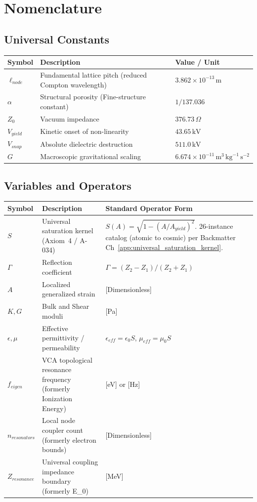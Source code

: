 \chapter*{Nomenclature}

\section*{Universal Constants}
\begin{table}[h]
\centering
\begin{tabularx}{\textwidth}{@{}l l X@{}}
\toprule
\textbf{Symbol} & \textbf{Description} & \textbf{Value / Unit} \\
\midrule
$\ell_{node}$ & Fundamental lattice pitch (reduced Compton wavelength) & $3.862 \times 10^{-13}\,\text{m}$ \\
$\alpha$ & Structural porosity (Fine-structure constant) & $1/137.036$ \\
$Z_0$ & Vacuum impedance & $376.73\,\Omega$ \\
$V_{yield}$ & Kinetic onset of non-linearity & $43.65\,\text{kV}$ \\
$V_{snap}$ & Absolute dielectric destruction & $511.0\,\text{kV}$ \\
$G$ & Macroscopic gravitational scaling & $6.674 \times 10^{-11}\,\text{m}^3\,\text{kg}^{-1}\,\text{s}^{-2}$ \\
\bottomrule
\end{tabularx}
\end{table}

\section*{Variables and Operators}
\begin{table}[h]
\centering\footnotesize
\begin{tabularx}{\textwidth}{@{}l l X@{}}
\toprule
\textbf{Symbol} & \textbf{Description} & \textbf{Standard Operator Form} \\
\midrule
$S$ & Universal saturation kernel (Axiom~4 / A-034) & $S(A) = \sqrt{1 - (A/A_{yield})^2}$. 26-instance catalog (atomic to cosmic) per Backmatter Ch~\ref{app:universal_saturation_kernel}. \\
$\Gamma$ & Reflection coefficient & $\Gamma = (Z_2 - Z_1)/(Z_2 + Z_1)$ \\
$A$ & Localized generalized strain & [Dimensionless] \\
$K, G$ & Bulk and Shear moduli & [Pa] \\
$\epsilon, \mu$ & Effective permittivity / permeability & $\epsilon_{eff} = \epsilon_0 S$, $\mu_{eff} = \mu_0 S$ \\
$f_{eigen}$ & VCA topological resonance frequency (formerly Ionization Energy) & [eV] or [Hz] \\
$n_{resonators}$ & Local node coupler count (formerly electron bounds) & [Dimensionless] \\
$Z_{resonance}$ & Universal coupling impedance boundary (formerly E\_0) & [MeV] \\
\bottomrule
\end{tabularx}
\end{table}
